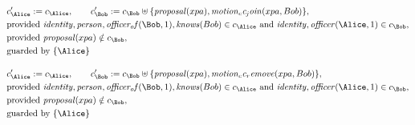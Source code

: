 \begin{align*}
&
c'_
{
\Alice
}
 := 
c_
{
\Alice
}
, \qquad 
c'_
{
\Bob
}
 := 
c_
{
\Bob
}
 \uplus 
\{
\mathit{
proposal
}
(
xpa
)
,
\mathit{
motion_cc_join
}
(
xpa
,
Bob
)
\}
,\\
&
\text{provided } 
\mathit{
identity
}
,
\mathit{
person
}
,
\mathit{
officer_of
}
(
\Bob
,
1
)
,
\mathit{
knows
}
(
Bob
)
 \in c_
{
\Alice
}
 \text{ and } 
\mathit{
identity
}
,
\mathit{
officer
}
(
\Alice
,
1
)
 \in c_
{
\Bob
}
,\\
&
\text{provided } 
\mathit{
proposal
}
(
xpa
)
 \notin c_
{
\Bob
}
,\\
&
\text{guarded by } \{
\Alice
\}
\end{align*}

\begin{align*}
&
c'_
{
\Alice
}
 := 
c_
{
\Alice
}
, \qquad 
c'_
{
\Bob
}
 := 
c_
{
\Bob
}
 \uplus 
\{
\mathit{
proposal
}
(
xpa
)
,
\mathit{
motion_cc_remove
}
(
xpa
,
Bob
)
\}
,\\
&
\text{provided } 
\mathit{
identity
}
,
\mathit{
person
}
,
\mathit{
officer_of
}
(
\Bob
,
1
)
,
\mathit{
knows
}
(
Bob
)
 \in c_
{
\Alice
}
 \text{ and } 
\mathit{
identity
}
,
\mathit{
officer
}
(
\Alice
,
1
)
 \in c_
{
\Bob
}
,\\
&
\text{provided } 
\mathit{
proposal
}
(
xpa
)
 \notin c_
{
\Bob
}
,\\
&
\text{guarded by } \{
\Alice
\}
\end{align*}
